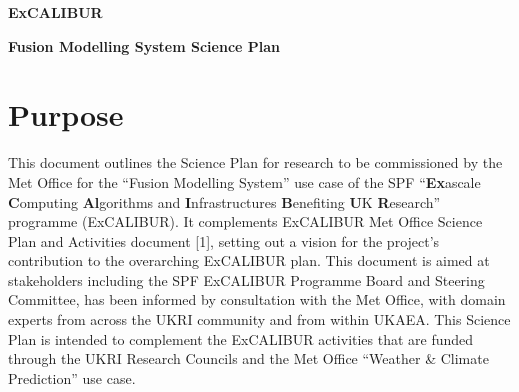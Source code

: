 \documentclass[a4paper]{article}
\begin{document}
\bigskip


\bigskip


\bigskip


\bigskip


\bigskip


\bigskip


\bigskip


\bigskip


\bigskip


\bigskip


\bigskip


\bigskip


\bigskip


\bigskip


\bigskip


\bigskip


\bigskip

{
\textbf{\textcolor[rgb]{0.12156863,0.28627452,0.49019608}{ExCALIBUR}}}

{
\textbf{\textcolor[rgb]{0.12156863,0.28627452,0.49019608}{Fusion Modelling System Science Plan }}}

\section[Purpose]{\textcolor[rgb]{0.12156863,0.28627452,0.49019608}{Purpose}}

\bigskip

{\color{black}
This document outlines the Science Plan for research to be commissioned by the Met Office for the ``Fusion Modelling
System'' use case of the SPF ``\textbf{\textcolor[rgb]{0.12156863,0.28627452,0.49019608}{Ex}}ascale
\textbf{\textcolor[rgb]{0.12156863,0.28627452,0.49019608}{C}}omputing
\textbf{\textcolor[rgb]{0.12156863,0.28627452,0.49019608}{Al}}gorithms and
\textbf{\textcolor[rgb]{0.12156863,0.28627452,0.49019608}{I}}nfrastructures
\textbf{\textcolor[rgb]{0.12156863,0.28627452,0.49019608}{B}}enefiting
\textbf{\textcolor[rgb]{0.12156863,0.28627452,0.49019608}{U}}K
\textbf{\textcolor[rgb]{0.12156863,0.28627452,0.49019608}{R}}esearch'' programme (ExCALIBUR). It complements ExCALIBUR
Met Office Science Plan and Activities document [1], setting out a vision for the project's contribution to the
overarching ExCALIBUR plan. This document is aimed at stakeholders including the SPF ExCALIBUR Programme Board and
Steering Committee, has been informed by consultation with the Met Office, with domain experts from across the UKRI
community and from within UKAEA. This Science Plan is intended to complement the ExCALIBUR activities that are funded
through the UKRI Research Councils and the Met Office ``Weather \& Climate Prediction'' use case.}
\end{document}
